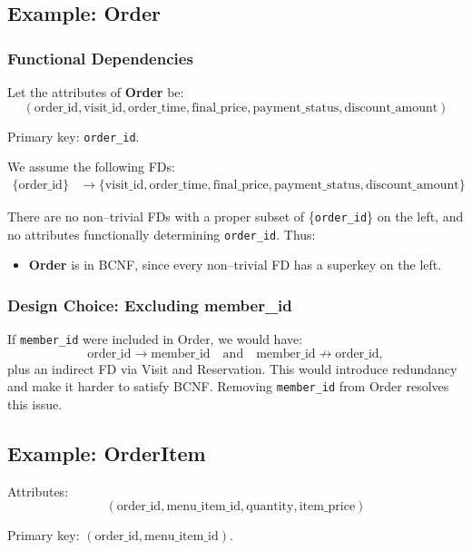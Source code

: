 \documentclass[11pt]{article}
\begin{document}
\subsection{Example: Order}

\subsubsection*{Functional Dependencies}

Let the attributes of \textbf{Order} be:
\[
(\text{order\_id}, \text{visit\_id}, \text{order\_time},
 \text{final\_price}, \text{payment\_status}, \text{discount\_amount})
\]

Primary key: \texttt{order\_id}.

We assume the following FDs:
\begin{align*}
\{\text{order\_id}\} &\rightarrow
    \{\text{visit\_id}, \text{order\_time},
      \text{final\_price}, \text{payment\_status},
      \text{discount\_amount}\}
\end{align*}

There are no non--trivial FDs with a proper subset of \{\texttt{order\_id}\}
on the left, and no attributes functionally determining \texttt{order\_id}.
Thus:
\begin{itemize}
    \item \textbf{Order} is in BCNF, since every non--trivial FD has a superkey on the left.
\end{itemize}

\subsubsection*{Design Choice: Excluding member\_id}

If \texttt{member\_id} were included in Order, we would have:
\[
    \text{order\_id} \rightarrow \text{member\_id}
    \quad \text{and} \quad
    \text{member\_id} \nrightarrow \text{order\_id},
\]
plus an indirect FD via Visit and Reservation. This would introduce redundancy
and make it harder to satisfy BCNF. Removing \texttt{member\_id} from Order
resolves this issue.

\subsection{Example: OrderItem}

Attributes:
\[
(\text{order\_id}, \text{menu\_item\_id}, \text{quantity}, \text{item\_price})
\]

Primary key: \((\text{order\_id}, \text{menu\_item\_id})\).
\end{document}
